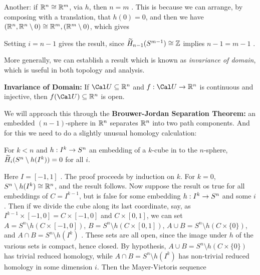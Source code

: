 \msk

Another: if ${\Bbb R}^n\cong {\Bbb R}^m$, via $h$, then $n=m$ .
This is because we can arrange, by composing with a translation, that $h(0)=0$, and then 
we have 
$({\Bbb R}^n,{\Bbb R}^n\setminus 0)\cong {\Bbb R}^m,({\Bbb R}^m\setminus 0)$, which gives


\ssk



\ssk

Setting $i=n-1$ gives the result, since $\widetilde{H}_{n-1}(S^{m-1})\cong {\Bbb Z}$ implies $n-1=m-1$ .

\msk

More generally, we can establish a result which is known as {\it invariance of domain},
which is useful in both topology and analysis.

\msk

{\bf Invariance of Domain:} If ${\Cal U}\subseteq {\Bbb R}^n$ and $f:{\Cal U}\ra {\Bbb R}^n$
is continuous and injective, then $f({\Cal U})\subseteq {\Bbb R}^n$ is open.

\msk

We will approach this through the {\bf Brouwer-Jordan Separation Theorem:} an embedded $(n-1)$-sphere
in ${\Bbb R}^n$ separates ${\Bbb R}^n$ into two path components. And for this we need to do a slightly
unusual homology calculation:

\ssk

For $k<n$ and $h:I^k\rightarrow S^n$ an embedding of a $k$-cube in to the $n$-sphere,
$\widetilde{H}_i(S^n\setminus h(I^k))=0$ for all $i$.

\ssk 

Here $I=[-1,1]$ . The proof proceeds by induction on $k$. For $k=0$, $S^n\setminus h(I^k)\cong {\Bbb R}^n$,
and the result follows. Now suppose the result os true for all embeddings of $C=I^{k-1}$,
but is false for some embedding $h:I^k\rightarrow S^n$ and some $i$. Then if we divide the cube along its last coordinate, say,
as $I^{k-1}\times [-1,0] = C\times [-1,0]$ and $C\times [0,1]$, we can set
$A=S^n\setminus h(C\times [-1,0])$, $B = S^n\setminus h(C\times [0,1])$, 
$A\cup B = S^n\setminus h(C\times \{0\})$, and $A\cap B = S^n\setminus h(I^k)$ .
These sets are all open, since the image under $h$ of the various sets is compact, hence closed.
By hypothesis, $A\cup B = S^n\setminus h(C\times \{0\})$ has trivial reduced homology, while
$A\cap B = S^n\setminus h(I^k)$ has non-trivial reduced homology in some dimension $i$. Then 
the Mayer-Vietoris sequence


